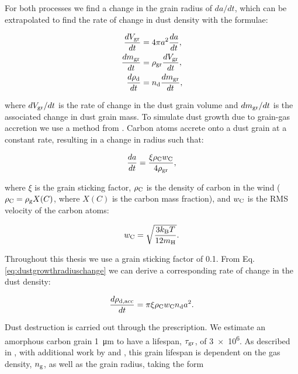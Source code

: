 For both processes we find a change in the grain radius of $da/dt$, which can be extrapolated to find the rate of change in dust density with the formulae:

\begin{subequations}
  \begin{align}
    \frac{dV_\text{gr}}{dt} & = 4 \pi a^2 \frac{da}{dt} ,\\
    \frac{dm_\text{gr}}{dt} & = \rho_\text{gr} \frac{dV_\text{gr}}{dt} ,\\
    \frac{d\rho_\text{d}}{dt}   & = n_\text{d} \frac{dm_\text{gr}}{dt} ,
  \end{align}
\end{subequations}

\noindent
where $dV_\text{gr}/dt$ is the rate of change in the dust grain volume and $dm_\text{gr}/dt$ is the associated change in dust grain mass.
To simulate dust growth due to grain-gas accretion we use a method from \textcite[Ch.~9]{spitzerPhysicalProcessesInterstellar2008}.
Carbon atoms accrete onto a dust grain at a constant rate, resulting in a change in radius such that:

\begin{equation}
  \label{eq:dustgrowthradiuschange}
  \frac{da}{dt} = \frac{\xi \rho_\text{C} w_\text{C}}{4\rho_\text{gr}} ,
\end{equation}

\noindent
where $\xi$ is the grain sticking factor, $\rho_\text{C}$ is the density of carbon in the wind ($\rho_\text{C} = \rho_\text{g} X(C)$, where $X(C)$ is the carbon mass fraction), and $w_\text{C}$ is the RMS velocity of the carbon atoms:

\begin{equation}
  \label{eq:rmsvelocitycarbon}
  w_\text{C} = \sqrt{\frac{3k_\text{B}T}{12 m_\text{H}}} .
\end{equation}

Throughout this thesis we use a grain sticking factor of 0.1.
From Eq. \ref{eq:dustgrowthradiuschange} we can derive a corresponding rate of change in the dust density:

\begin{equation}
  \label{eq:dustgrowthratemodel}
  \frac{d \rho_\text{d,acc}}{dt} = \pi \xi \rho_\text{C} w_\text{C} n_\text{d} a^2.
\end{equation}

\noindent
Dust destruction is carried out through the \textcite{draineDestructionMechanismsInterstellar1979} prescription.
We estimate an amorphous carbon grain \SI{1}{\micro\metre} to have a lifespan, $\tau_\text{gr}$, of \SI{3e6}{\year}.
As described in \textcite{draineDestructionMechanismsInterstellar1979}, with additional work by \textcite{tielens_physics_1994} and \textcite{dwekCoolingSputteringInfrared1996}, this grain lifespan is dependent on the gas density, $n_\text{g}$, as well as the grain radius, taking the form

